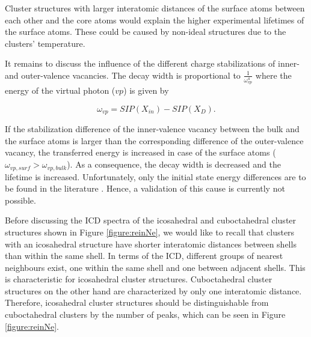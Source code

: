 Cluster structures with larger interatomic distances of the surface atoms between
each other and the core atoms would explain the higher experimental lifetimes of
the surface atoms. These could be caused by non-ideal structures due to the
clusters' temperature.

It remains to discuss the influence of the different charge stabilizations of
inner- and outer-valence vacancies. The decay width is proportional to
$\frac{1}{\omega_{vp}^4}$ where the energy of the virtual photon ($vp$) is given
by

\begin{equation}
 \omega_{vp} = SIP(X_{in}) - SIP(X_D)   .
\end{equation}

If the stabilization difference of the inner-valence vacancy between the bulk
and the surface atoms is larger than the corresponding difference of
the outer-valence
vacancy, the transferred energy is increased in case of the surface atoms
($\omega_{vp,surf} > \omega_{vp,bulk}$). As a consequence, the decay width
is decreased and the lifetime is increased. Unfortunately, only the initial
state energy differences are to be found in the literature \cite{Ohrwall04}.
Hence, a validation of this cause is currently not possible.


Before discussing the ICD spectra  of the icosahedral and cuboctahedral
cluster structures shown in Figure \ref{figure:reinNe}, we would like to
recall that clusters with an icosahedral structure
have shorter interatomic distances between shells than within the same
shell.
In terms of the ICD, different groups of nearest neighbours exist,
one within the same shell and one
between adjacent shells. This is characteristic for icosahedral cluster
structures. Cuboctahedral cluster structures on the other hand are characterized
by only one interatomic distance. 
Therefore, icosahedral cluster structures should be distinguishable from
cuboctahedral clusters by the number of peaks, which can be seen in Figure
\ref{figure:reinNe}.

